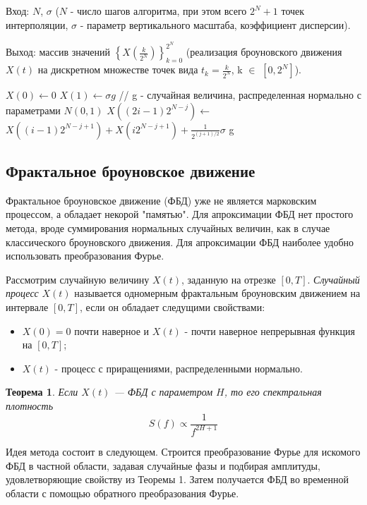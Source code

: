 Вход: $N$, 	$\sigma$ ($N$ - число шагов алгоритма, при этом всего $2^N + 1$ точек интерполяции, $\sigma$ - параметр вертикального масштаба, коэффициент дисперсии).

Выход: массив значений $\left\{X(\frac{k}{2^N})\right\}_{k=0}^{2^N}$ (реализация броуновского движения $X(t)$ на дискретном множестве точек вида $t_k = \frac{k}{2^N}$, k $\in$ $[0, 2^N]$).

\begin{algorithmic}[1]
	\State $X(0)\gets 0$
	\State $X(1)\gets \sigma g$ // g - случайная величина, распределенная нормально с параметрами $N(0,1)$
	\State $X((2i - 1) 2^{N - j})$$\gets$ $X((i - 1)2^{N-j+1}) + X(i2^{N - j + 1}) + \frac{1}{2^{(j+1)/2}}$$\sigma$ g
	\EndFor
	\EndFor
\end{algorithmic}

\subsection{Фрактальное броуновское движение}

Фрактальное броуновское движение (ФБД) уже не является марковским процессом, а обладает некорой "памятью". Для апроксимации ФБД нет простого метода, вроде суммирования нормальных случайных величин, как в случае классического броуновского движения. Для апроксимации ФБД наиболее удобно использовать преобразования Фурье.

Рассмотрим случайную величину $X(t)$, заданную на отрезке $[0, T]$. \textit{Случайный процесс}  $X(t)$ называется одномерным фрактальным броуновским движением на интервале $[0, T]$, если он обладает следущими свойствами:

\begin{itemize}
	\item $X(0) = 0$ почти наверное и $X(t)$ - почти наверное непрерывная функция на $[0, T]$;
	\item  $X(t)$ - процесс с приращениями, распределенными нормально.
\end{itemize}

\newtheorem{theorem1}{Теорема}
\begin{theorem1}
	Если $X(t)$ --- ФБД с параметром $H$, то его спектральная плотность 
	\begin{equation}
		S(f) \propto \frac{1}{f^{2H+1}}
	\end{equation}
\end{theorem1}

Идея метода состоит в следующем. Строится преобразование Фурье для искомого ФБД в частной области, задавая случайные фазы и подбирая амплитуды, удовлетворяющие свойству из Теоремы 1. Затем получается ФБД во временной области с помощью обратного преобразования Фурье.

